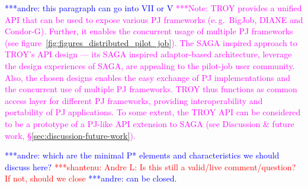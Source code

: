 \documentclass[conference,final]{IEEEtran}
\newcommand{\jhanote}[1]{ {\textcolor{red} { ***shantenu: #1 }}}
\newcommand{\alnote}[1]{ {\textcolor{blue} { ***andre: #1 }}}
\newcommand{\note}[1]{ {\textcolor{magenta} { ***Note: #1 }}}
\newcommand{\alnote}[1]{}
\newcommand{\jhanote}[1]{}
\newcommand{\note}[1]{}
\begin{document}
\alnote{this paragraph can go into VII or V} \note{TROY provides a
  unified API that can be used to expose various PJ frameworks
  (e.\,g.\ BigJob, DIANE and Condor-G). Further, it enables the
  concurrent usage of multiple PJ frameworks (see
  figure~\ref{fig:figures_distributed_pilot_job}). The SAGA inspired
  approach to TROY's API design --- its SAGA inspired adaptor-based
  architecture, leverage the design experiences of SAGA, are appealing
  to the pilot-job user community. Also, the chosen designs enables
  the easy exchange of PJ implementations and the concurrent use of
  multiple PJ frameworks. TROY thus functions as common access layer
  for different PJ frameworks, providing interoperability and
  portability of PJ applications. To some extent, the TROY API can be
  considered to be a prototype of a PJ-like API extension to SAGA (see
  Discussion \& future work, \S\ref{sec:discussion-future-work}).}








\alnote{which are the minimal P* elements and characteristics we
  should discuss here?}  \jhanote{Andre L: Is this still a valid/live
  comment/question? If not, should we close}\alnote{can be closed.}
\end{document}
